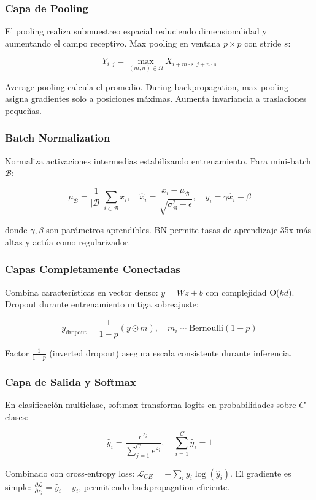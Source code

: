 \subsubsection*{Capa de Pooling}
El pooling realiza submuestreo espacial reduciendo dimensionalidad y aumentando el campo receptivo. Max pooling en ventana $p \times p$ con stride $s$:

\[
Y_{i,j} = \max_{(m,n) \in \Omega} X_{i+m \cdot s, j+n \cdot s}
\]

Average pooling calcula el promedio. During backpropagation, max pooling asigna gradientes solo a posiciones máximas. Aumenta invariancia a traslaciones pequeñas.  

\subsubsection*{Batch Normalization}
Normaliza activaciones intermedias estabilizando entrenamiento. Para mini-batch $\mathcal{B}$:

\[
\mu_{\mathcal{B}} = \frac{1}{|\mathcal{B}|} \sum_{i \in \mathcal{B}} x_i, \quad \hat{x}_i = \frac{x_i - \mu_{\mathcal{B}}}{\sqrt{\sigma_{\mathcal{B}}^2 + \epsilon}}, \quad y_i = \gamma \hat{x}_i + \beta
\]

donde $\gamma, \beta$ son parámetros aprendibles. BN permite tasas de aprendizaje 35x más altas y actúa como regularizador.  

\subsubsection*{Capas Completamente Conectadas}
Combina características en vector denso: $y = Wz + b$ con complejidad O($kd$). Dropout durante entrenamiento mitiga sobreajuste:

\[
y_{\text{dropout}} = \frac{1}{1-p} (y \odot m), \quad m_i \sim \text{Bernoulli}(1-p)
\]

Factor $\frac{1}{1-p}$ (inverted dropout) asegura escala consistente durante inferencia.  

\subsubsection*{Capa de Salida y Softmax}
En clasificación multiclase, softmax transforma logits en probabilidades sobre $C$ clases:

\[
\hat{y}_i = \frac{e^{z_i}}{\sum_{j=1}^C e^{z_j}}, \quad \sum_{i=1}^C \hat{y}_i = 1
\]

Combinado con cross-entropy loss: $\mathcal{L}_{CE} = -\sum_i y_i \log(\hat{y}_i)$. El gradiente es simple: $\frac{\partial \mathcal{L}}{\partial z_i} = \hat{y}_i - y_i$, permitiendo backpropagation eficiente.  


